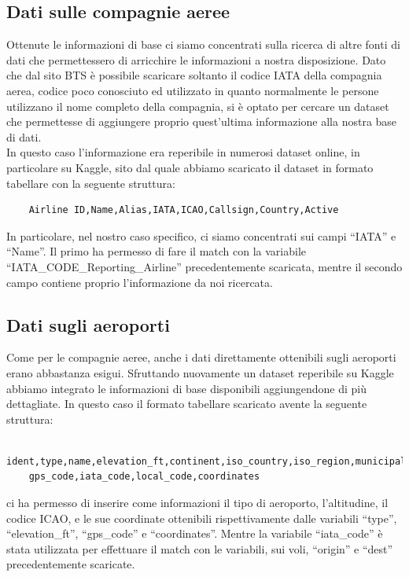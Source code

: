 \documentclass[12pt]{article}
\begin{document}
\subsection{Dati sulle compagnie aeree}
Ottenute le informazioni di base ci siamo concentrati sulla ricerca di altre fonti di dati che permettessero di arricchire le informazioni a nostra disposizione. Dato che dal sito BTS è possibile scaricare soltanto il codice IATA della compagnia aerea, codice poco conosciuto ed utilizzato in quanto normalmente le persone utilizzano il nome completo della compagnia, si è optato per cercare un dataset che permettesse di aggiungere proprio quest'ultima informazione alla nostra base di dati.\\
In questo caso l'informazione era reperibile in numerosi dataset online, in particolare su Kaggle\cite{kaggleAirlines}, sito dal quale abbiamo scaricato il dataset in formato tabellare con la seguente struttura:
\begin{verbatim}
    Airline ID,Name,Alias,IATA,ICAO,Callsign,Country,Active
\end{verbatim}
In particolare, nel nostro caso specifico, ci siamo concentrati sui campi ``IATA'' e ``Name''. Il primo ha permesso di fare il match con la variabile ``IATA\_CODE\_Reporting\_Airline'' precedentemente scaricata, mentre il secondo campo contiene proprio l'informazione da noi ricercata.

\subsection{Dati sugli aeroporti}
Come per le compagnie aeree, anche i dati direttamente ottenibili sugli aeroporti erano abbastanza esigui. Sfruttando nuovamente un dataset reperibile su Kaggle\cite{kaggleAirports} abbiamo integrato le informazioni di base disponibili aggiungendone di più dettagliate. In questo caso il formato tabellare scaricato avente la seguente struttura:
\begin{verbatim}
    ident,type,name,elevation_ft,continent,iso_country,iso_region,municipality,
    gps_code,iata_code,local_code,coordinates
\end{verbatim}
ci ha permesso di inserire come informazioni il tipo di aeroporto, l'altitudine, il codice ICAO, e le sue coordinate ottenibili rispettivamente dalle variabili ``type'', ``elevation\_ft'', ``gps\_code''  e ``coordinates''. Mentre la variabile ``iata\_code'' è stata utilizzata per effettuare il match con le variabili, sui voli, ``origin'' e ``dest'' precedentemente scaricate.
\end{document}
